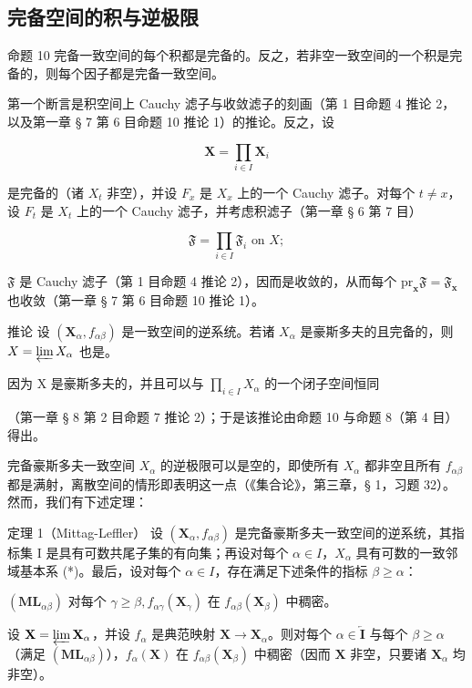\subsection{完备空间的积与逆极限}

命题 10 完备一致空间的每个积都是完备的。反之，若非空一致空间的一个积是完备的，则每个因子都是完备一致空间。

第一个断言是积空间上 Cauchy 滤子与收敛滤子的刻画（第 1 目命题 4 推论 2，以及第一章 § 7 第 6 目命题 10 推论 1）的推论。反之，设

\[
\mathbf {X} = \prod_ {i \in I} \mathbf {X} _ {i}
\]

是完备的（诸 \(X_{t}\) 非空），并设 \(F_{x}\) 是 \(X_{x}\) 上的一个 Cauchy 滤子。对每个 \(t \neq x\)，设 \(F_{t}\) 是 \(X_{t}\) 上的一个 Cauchy 滤子，并考虑积滤子（第一章 § 6 第 7 目）

\[
\mathfrak {F} = \prod_ {i \in I} \mathfrak {F} _ {i} \text { on } X;
\]

\(\mathfrak{F}\) 是 Cauchy 滤子（第 1 目命题 4 推论 2），因而是收敛的，从而每个 \(\mathrm{pr}_{\mathbf{x}}\mathfrak{F} = \mathfrak{F}_{\mathbf{x}}\) 也收敛（第一章 § 7 第 6 目命题 10 推论 1）。

推论 设 \((\mathbf{X}_{\alpha}, f_{\alpha\beta})\) 是一致空间的逆系统。若诸 \(X_{\alpha}\) 是豪斯多夫的且完备的，则 \(X = \varprojlim X_{\alpha}\) 也是。

因为 X 是豪斯多夫的，并且可以与 \(\prod_{i\in I}X_{\alpha}\) 的一个闭子空间恒同

（第一章 § 8 第 2 目命题 7 推论 2）；于是该推论由命题 10 与命题 8（第 4 目）得出。

完备豪斯多夫一致空间 \(X_{\alpha}\) 的逆极限可以是空的，即使所有 \(X_{\alpha}\) 都非空且所有 \(f_{\alpha\beta}\) 都是满射，离散空间的情形即表明这一点（《集合论》，第三章，§ 1，习题 32）。然而，我们有下述定理：

定理 1（Mittag-Leffler） 设 \((\mathbf{X}_{\alpha}, f_{\alpha\beta})\) 是完备豪斯多夫一致空间的逆系统，其指标集 I 是具有可数共尾子集的有向集；再设对每个 \(\alpha \in I\)，\(X_{\alpha}\) 具有可数的一致邻域基本系 (*)。最后，设对每个 \(\alpha \in I\)，存在满足下述条件的指标 \(\beta \geqslant \alpha\)：

\((\mathbf{ML}_{\alpha \beta})\) 对每个 \(\gamma \geqslant \beta, f_{\alpha \gamma}(\mathbf{X}_{\gamma})\) 在 \(f_{\alpha \beta}(\mathbf{X}_{\beta})\) 中稠密。

设 \(\mathbf{X} = \varprojlim \mathbf{X}_{\alpha}\)，并设 \(f_{\alpha}\) 是典范映射 \(\mathbf{X} \to \mathbf{X}_{\alpha}\)。则对每个 \(\alpha \in \overleftarrow{\mathbf{I}}\) 与每个 \(\beta \geqslant \alpha\)（满足 \((\mathbf{ML}_{\alpha\beta})\)），\(f_{\alpha}(\mathbf{X})\) 在 \(f_{\alpha\beta}(\mathbf{X}_{\beta})\) 中稠密（因而 \(\mathbf{X}\) 非空，只要诸 \(\mathbf{X}_{\alpha}\) 均非空）。

